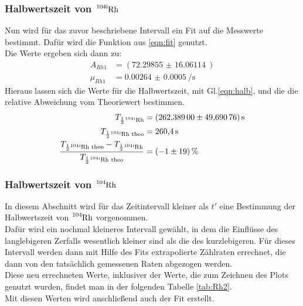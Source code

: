 \subsubsection{Halbwertszeit von $\ce{^{\text{104i}}_{}\text{Rh}}$}

\noindent
Nun wird für das zuvor beschriebene Intervall ein Fit auf die Messwerte bestimmt. 
Dafür wird die Funktion aus \ref{eqn:fit} genutzt.\\
Die Werte ergeben sich dann zu:
\begin{align*}
    A_{Rh1}&=(\SI{72.29855(1606114)}{})\\
    \mu_{Rh1}&=\SI{0.00264(000050)}{\per\second}
\end{align*}
Hieraus lassen sich die Werte für die Halbwertszeit, mit Gl.\ref{eqn:halb}, und die die relative Abweichung vom Theoriewert\cite{Rhodium} bestimmen.
\begin{align*}
    T_{\frac{1}{2}\ce{^{104i}_{}Rh}}&= \SI{262.38900(4969076)}{\second}\\
    T_{\frac{1}{2}\ce{^{104i}_{}Rh}\text{ theo}}&= \SI{260.4}{\second}\\
    \frac{T_{\frac{1}{2}\ce{^{104i}_{}Rh} \text{ theo}} - T_{\frac{1}{2}\ce{^{104i}_{}Rh}}}{T_{\frac{1}{2}\ce{^{104i}_{}Rh}\text{ theo}}}&=\SI{-01(19)}{\percent}
\end{align*}

\subsubsection{Halbwertszeit von $\ce{^{\text{104}}_{}\text{Rh}}$}

In diesem Abschnitt wird für das Zeitintervall kleiner als $t'$ eine Bestimmung der Halbwertszeit von $\ce{^{104}_{}Rh}$ vorgenommen.\\
Dafür wird ein nochmal kleineres Intervall gewählt, in dem die Einflüsse des langlebigeren Zerfalls wesentlich kleiner sind als die des kurzlebigeren.
Für dieses Intervall werden dann mit Hilfe des Fits extrapolierte Zählraten errechnet, die dann von den tatsächlich gemessenen Raten abgezogen werden.\\
Diese neu errechneten Werte, inklusiver der Werte, die zum Zeichnen des Plots genutzt wurden, findet man in der folgenden Tabelle \ref{tab:Rh2}.\\
Mit diesen Werten wird anschließend auch der Fit erstellt.\\

